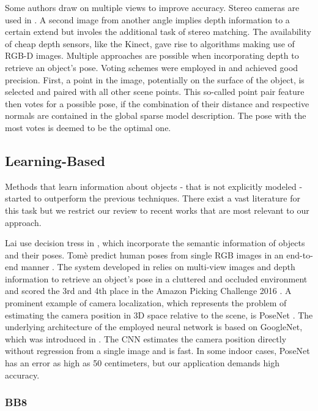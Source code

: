 Some authors draw on multiple views to improve accuracy. Stereo cameras are used in \cite{kpauwels}. A second image from another angle implies depth information to a certain extend but involes the additional task of stereo matching. The availability of cheap depth sensors, like the Kinect, gave rise to algorithms making use of RGB-D images. Multiple approaches are possible when incorporating depth to retrieve an object's pose. Voting schemes were employed in \cite{bdrost, salasmoreno} and achieved good precision. First, a point in the image, potentially on the surface of the object, is selected and paired with all other scene points. This so-called point pair feature then votes for a possible pose, if the combination of their distance and respective normals are contained in the global sparse model description. The pose with the most votes is deemed to be the optimal one.

\subsection{Learning-Based}

Methods that learn information about objects - that is not explicitly modeled - started to outperform the previous techniques. There exist a vast literature for this task but we restrict our review to recent works that are most relevant to our approach.

Lai \etal use decision tress in \cite{klai}, which incorporate the semantic information of objects and their poses. Tom{\`{e}} \etal predict human poses from single RGB images in an end-to-end manner \cite{dtome}. The system developed in \cite{azeng} relies on multi-view images and depth information to retrieve an object's pose in a cluttered and occluded environment and scored the 3rd and 4th place in the Amazon Picking Challenge 2016 \cite{apc}. A prominent example of camera localization, which represents the problem of estimating the camera position in 3D space relative to the scene, is PoseNet \cite{posenet}. The underlying architecture of the employed neural network is based on GoogleNet, which was introduced in \cite{googlenet}. The CNN estimates the camera position directly without regression from a single image and is fast. In some indoor cases, PoseNet has an error as high as 50 centimeters, but our application demands high accuracy.

\subsubsection{BB8}


